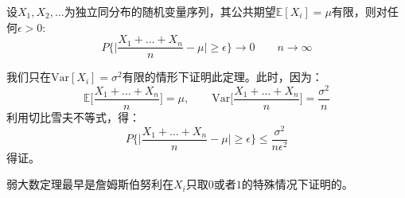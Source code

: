 \documentclass[10pt,a4paper,UTF8]{article}
\begin{document}
\begin{tikztheorem}
设\(X_{1},X_{2},\ldots\)为独立同分布的随机变量序列，其公共期望\(\mathbb{E}[X_{i}] = \mu\)有限，则对任何\(\epsilon > 0\):
\begin{equation}
\label{eq:13}
P\bigg\{ \bigg| \frac{X_{1}+ \ldots + X_{n}}{n} - \mu \bigg| \geq \epsilon \bigg\} \to 0 \qquad n\to \infty
\end{equation}
\end{tikztheorem}
\begin{tikzproof}
我们只在\(\mathrm{Var}[X_{i}] = \sigma^{2}\)有限的情形下证明此定理。此时，因为：
\begin{equation}
\label{eq:14}
\mathbb{E}\bigg[\frac{X_{1} +\ldots +X_{n}}{n}\bigg] = \mu, \qquad  \mathrm{Var}\bigg[ \frac{X_{1} +\ldots +X_{n}}{n} \bigg] = \frac{\sigma^{2}}{n}
\end{equation}
利用切比雪夫不等式，得：
\begin{equation}
\label{eq:15}
P\bigg\{ \bigg| \frac{X_{1}+ \ldots + X_{n}}{n} - \mu \bigg| \geq \epsilon \bigg\} \leq \frac{\sigma^{2}}{n\epsilon^{2}}
\end{equation}
得证。
\end{tikzproof}

弱大数定理最早是詹姆斯伯努利在\(X_{i}\)只取\(0\)或者\(1\)的特殊情况下证明的。
\end{document}
